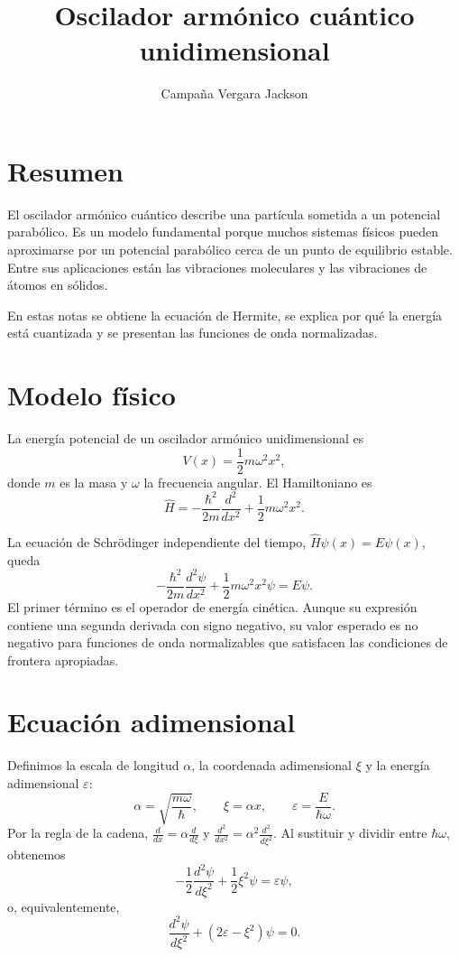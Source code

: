 \documentclass[12pt]{article}
\title{Oscilador armónico cuántico unidimensional}
\author{Campaña Vergara Jackson}
\date{}
\begin{document}
\maketitle

\section{Resumen}

El oscilador armónico cuántico describe una partícula sometida a un potencial
parabólico. Es un modelo fundamental porque muchos sistemas físicos pueden
aproximarse por un potencial parabólico cerca de un punto de equilibrio estable.
Entre sus aplicaciones están las vibraciones moleculares y las vibraciones de
átomos en sólidos.

En estas notas se obtiene la ecuación de Hermite, se explica por qué la energía
está cuantizada y se presentan las funciones de onda normalizadas.

\section{Modelo físico}

La energía potencial de un oscilador armónico unidimensional es
\[
V(x)=\frac{1}{2}m\omega^2x^2,
\]
donde \(m\) es la masa y \(\omega\) la frecuencia angular. El Hamiltoniano es
\[
\hat{H}
=-\frac{\hbar^2}{2m}\frac{d^2}{dx^2}
+\frac{1}{2}m\omega^2x^2.
\]

La ecuación de Schrödinger independiente del tiempo,
\(\hat{H}\psi(x)=E\psi(x)\), queda
\[
-\frac{\hbar^2}{2m}\frac{d^2\psi}{dx^2}
+\frac{1}{2}m\omega^2x^2\psi
=E\psi.
\]
El primer término es el operador de energía cinética. Aunque su expresión
contiene una segunda derivada con signo negativo, su valor esperado es no
negativo para funciones de onda normalizables que satisfacen las condiciones de
frontera apropiadas.

\section{Ecuación adimensional}

Definimos la escala de longitud \(\alpha\), la coordenada adimensional \(\xi\)
y la energía adimensional \(\varepsilon\):
\[
\alpha=\sqrt{\frac{m\omega}{\hbar}},
\qquad
\xi=\alpha x,
\qquad
\varepsilon=\frac{E}{\hbar\omega}.
\]
Por la regla de la cadena,
\(\frac{d}{dx}=\alpha\frac{d}{d\xi}\) y
\(\frac{d^2}{dx^2}=\alpha^2\frac{d^2}{d\xi^2}\). Al sustituir y dividir entre
\(\hbar\omega\), obtenemos
\[
-\frac{1}{2}\frac{d^2\psi}{d\xi^2}
+\frac{1}{2}\xi^2\psi
=\varepsilon\psi,
\]
o, equivalentemente,
\begin{equation}
\frac{d^2\psi}{d\xi^2}
+\left(2\varepsilon-\xi^2\right)\psi=0.
\label{eq:dimensionless}
\end{equation}
\end{document}
